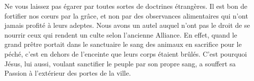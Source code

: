 Ne vous laissez pas égarer par toutes sortes de doctrines étrangères.
Il est bon de fortifier nos cœurs par la grâce,
	et non par des observances alimentaires qui n’ont jamais profité à leurs adeptes.
Nous avons un autel auquel n’ont pas le droit de se nourrir
		ceux qui rendent un culte selon l’ancienne Alliance.
En effet, quand le grand prêtre portait dans le sanctuaire le sang des animaux
		en sacrifice pour le péché,
	c’est en dehors de l’enceinte que leurs corps étaient brûlés.
C’est pourquoi Jésus, lui aussi, voulant sanctifier le peuple par son propre sang,
	a souffert sa Passion à l’extérieur des portes de la ville.
